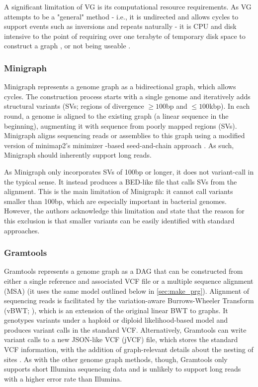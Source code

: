 A significant limitation of VG is its computational resource requirements. As VG attempts to be a "general" method - i.e., it is undirected and allows cycles to support events such as inversions and repeats naturally - it is CPU and disk intensive \cite{strainflair2021,gramtools2021,minigraph2020} to the point of requiring over one terabyte of temporary disk space to construct a graph \cite{gramtools2021}, or not being useable \cite{minigraph2020}.

\subsubsection{Minigraph}
Minigraph \cite{minigraph2020} represents a genome graph as a bidirectional graph, which allows cycles. The construction process starts with a single genome and iteratively adds structural variants (SVs; regions of divergence $\ge 100$bp and $\le 100$kbp). In each round, a genome is aligned to the existing graph (a linear sequence in the beginning), augmenting it with sequence from poorly mapped regions (SVs). Minigraph aligns sequencing reads or assemblies to this graph using a modified version of minimap2's minimizer \kmer{}-based seed-and-chain approach \cite{li2018}. As such, Minigraph should inherently support long reads.

As Minigraph only incorporates SVs of 100bp or longer, it does not variant-call in the typical sense. It instead produces a BED-like file that calls SVs from the alignment. This is the main limitation of Minigraph: it cannot call variants smaller than 100bp, which are especially important in bacterial genomes. However, the authors acknowledge this limitation and state that the reason for this exclusion is that smaller variants can be easily identified with standard approaches. 

\subsubsection{Gramtools}
Gramtools \cite{gramtools2016,gramtools2021} represents a genome graph as a DAG that can be constructed from either a single reference and associated VCF file or a multiple sequence alignment (MSA) (it uses the same model outlined below in \autoref{sec:make_prg}). Alignment of sequencing reads is facilitated by the variation-aware Burrows-Wheeler Transform (vBWT; \cite{gramtools2016}), which is an extension of the original linear BWT to graphs. It genotypes variants under a haploid or diploid likelihood-based model and produces variant calls in the standard VCF. Alternatively, Gramtools can write variant calls to a new JSON-like VCF (jVCF) file, which stores the standard VCF information, with the addition of graph-relevant details about the nesting of sites \cite{gramtools2021}. As with the other genome graph methods, though, Gramtools only supports short Illumina sequencing data and is unlikely to support long reads with a higher error rate than Illumina.

